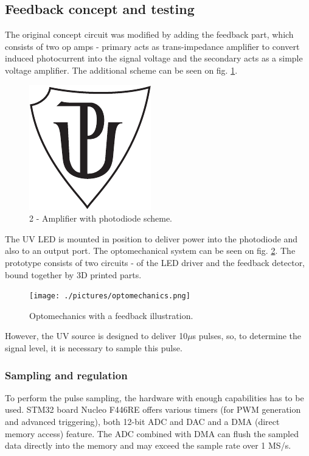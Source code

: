 \subsection{Feedback concept and testing}

The original concept circuit was modified by adding the feedback part, which consists of two op amps - primary acts as trans-impedance amplifier to convert induced photocurrent into the signal voltage and the secondary acts as a simple voltage amplifier. The additional scheme can be seen on fig. \ref{Amplifier}.
   
\begin{figure}[H]
 \centering
 \includegraphics[scale=0.5]{up_logo_bw}
 \caption{2 - Amplifier with photodiode scheme.}
 \label{Amplifier}
\end{figure}

The UV LED is mounted in position to deliver power into the photodiode and also to an output port. The optomechanical system can be seen on fig. \ref{Optomechanics}. The prototype consists of two circuits - of the LED driver and the feedback detector, bound together by 3D printed parts.

\begin{figure}[H]
 \centering
 \texttt{[image: ./pictures/optomechanics.png]}
 \caption{Optomechanics with a feedback illustration.}
 \label{Optomechanics}
\end{figure}


However, the UV source is designed to deliver 10$\mu$s pulses, so, to determine the signal level, it is necessary to sample this pulse. 

\subsubsection{Sampling and regulation}

To perform the pulse sampling, the hardware with enough capabilities has to be used. STM32 board Nucleo F446RE \cite{NucF446RE} offers various timers (for PWM generation and advanced triggering), both 12-bit ADC and DAC and a DMA (direct memory access) feature. The ADC combined with DMA can flush the sampled data directly into the memory and may exceed the sample rate over 1 MS/s.

